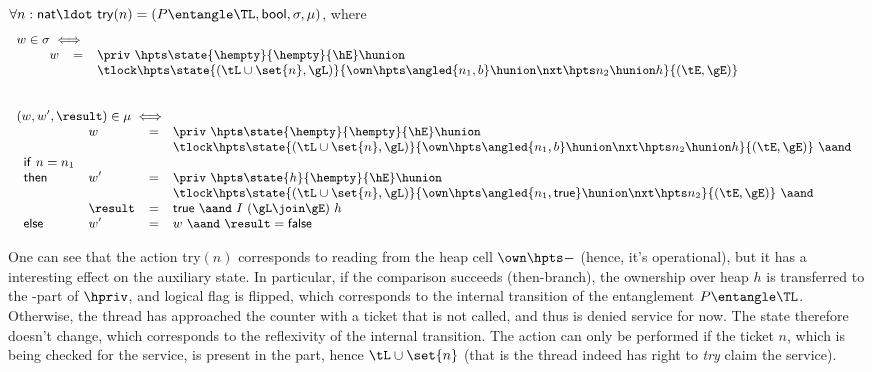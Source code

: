 \begin{definition}  
\label{def:try-act}
%
$\forall n:\mathsf{nat}\ldot~\mathsf{try}(n) = (P \entangle \TL, \mathsf{bool}, \sigma, \mu)$, where
%
\[
{\small
\begin{array}{l}
w \in \sigma \iff
\\
\begin{array}{lcl}
~~~~~~  w & = & \priv ~\hpts \state{\hempty}{\hempty}{\hE} \hunion \\
  &&\tlock \hpts \state{(\tL \cup \set{n}, \gL)}{\own \hpts \angled{n_1, b}
    \hunion \nxt \hpts n_2 \hunion h}{(\tE, \gE)}\\ \\
\end{array}    
\\ \\
(w, w', \result) \in \mu \iff 
\\
\begin{array}{llcl}
 &  w & = & \priv ~\hpts \state{\hempty}{\hempty}{\hE} \hunion \\
 &&&\tlock \hpts \state{(\tL \cup \set{n}, \gL)}{\own \hpts \angled{n_1, b}
     \hunion \nxt \hpts n_2 \hunion h}{(\tE, \gE)} ~\aand\\  
\mathsf{if}~ n = n_1 \\
\mathsf{then} &  
w' & = & \priv ~\hpts \state{h}{\hempty}{\hE} \hunion \\
  &&&\tlock \hpts \state{(\tL \cup \set{n}, \gL)}{\own \hpts \angled{n_1, \mathsf{true}}
    \hunion \nxt \hpts n_2}{(\tE, \gE)} ~\aand\\  
  & \result &=& \mathsf{true}  ~\aand~ I~(\gL \join \gE)~h \\
\mathsf{else} &  
w' & = & w ~\aand~ \result = \mathsf{false} \\
\end{array}
\end{array}
}
\]
\end{definition}
%
One can see that the action \textsf{try}$(n)$ corresponds to reading
from the heap cell $\own \hpts -$ (hence, it's operational), but it
has a interesting effect on the auxiliary state. In particular, if the
comparison succeeds (\textsf{then}-branch), the ownership over heap
$h$ is transferred to the \self-part of $\hpriv$, and logical flag is
flipped, which corresponds to the internal transition of the
entanglement $P \entangle \TL$. Otherwise, the thread has approached
the counter with a ticket that is not called, and thus is denied
service for now. The state therefore doesn't change, which corresponds
to the reflexivity of the internal transition. The action can only be
performed if the ticket $n$, which is being checked for the service,
is present in the \self part, hence $\tL \cup \set{n}$ (that is the
thread indeed has right to \emph{try} claim the service).

